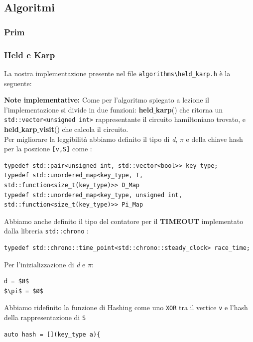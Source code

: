 \documentclass[]{article}
\begin{document}
\subsection{Algoritmi}
\subsubsection{Prim}
\newpage
\subsubsection{Held e Karp}
\begin{flushleft}
La nostra implementazione presente nel file \verb|algorithms\held_karp.h| è la seguente:
\lstset{language=c++, style=mystyle}


\textbf{Note implementative:}
Come per l'algoritmo spiegato a lezione il l'implementazione si divide in due funzioni: \textbf{held$\_$karp}() che ritorna un \verb|std::vector<unsigned int>| rappresentante il circuito hamiltoniano trovato, e \textbf{held$\_$karp$\_$visit}() che calcola il circuito.\\
Per migliorare la leggibilità abbiamo definito il tipo di \textit{d}, $\pi$ e della chiave hash per la poszione \verb|[v,S]| come :
\lstset{language=c++, style=mystyle, firstnumber=1}
\begin{lstlisting}
typedef std::pair<unsigned int, std::vector<bool>> key_type;
typedef std::unordered_map<key_type, T, std::function<size_t(key_type)>> D_Map
typedef std::unordered_map<key_type, unsigned int, std::function<size_t(key_type)>> Pi_Map
\end{lstlisting}
Abbiamo anche definito il tipo del contatore per il \textbf{TIMEOUT} implementato dalla libreria \verb|std::chrono| :
\lstset{language=c++, style=mystyle, firstnumber=4}
\begin{lstlisting}
typedef std::chrono::time_point<std::chrono::steady_clock> race_time;
\end{lstlisting}
\medskip
Per l'inizializzazione di \textit{d} e $\pi$: 
\begin{lstlisting}[mathescape=true]
d = $Ø$
$\pi$ = $Ø$
\end{lstlisting}
Abbiamo ridefinito la funzione di Hashing come uno \verb|XOR| tra il vertice \verb|v| e l'hash della rappresentazione di \verb|S|
\lstset{language=c++, style=mystyle, firstnumber=35}
\begin{lstlisting}
auto hash = [](key_type a){

\end{lstlisting}
\end{flushleft}
\end{document}
